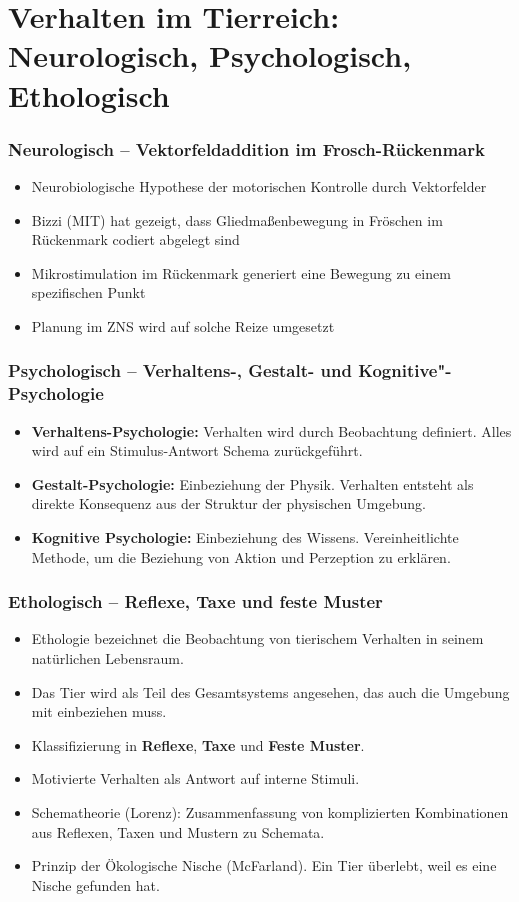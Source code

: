 \section{Verhalten im Tierreich: Neurologisch, Psychologisch, Ethologisch}

\subsubsection{Neurologisch -- Vektorfeldaddition im Frosch-Rückenmark}
\begin{itemize}
	\item Neurobiologische Hypothese der motorischen Kontrolle durch Vektorfelder
	\item Bizzi (MIT) hat gezeigt, dass Gliedmaßenbewegung in Fröschen im Rückenmark codiert abgelegt sind
	\item Mikrostimulation im Rückenmark generiert eine Bewegung zu einem spezifischen Punkt
	\item Planung im ZNS wird auf solche Reize umgesetzt
\end{itemize}

\subsubsection{Psychologisch -- Verhaltens-, Gestalt- und Kognitive"-Psychologie}
\begin{itemize}
	\item \textbf{Verhaltens-Psychologie:}
	Verhalten wird durch Beobachtung definiert.
	Alles wird auf ein Stimulus-Antwort Schema zurückgeführt.
	\item \textbf{Gestalt-Psychologie:}
	Einbeziehung der Physik.
	Verhalten entsteht als direkte Konsequenz aus der Struktur der physischen Umgebung.
	\item \textbf{Kognitive Psychologie:}
	Einbeziehung des Wissens.
	Vereinheitlichte Methode, um die Beziehung von Aktion und Perzeption zu erklären.
\end{itemize}

\subsubsection{Ethologisch -- Reflexe, Taxe und feste Muster}
\begin{itemize}
	\item Ethologie bezeichnet die Beobachtung von tierischem Verhalten in seinem natürlichen Lebensraum.
	\item Das Tier wird als Teil des Gesamtsystems angesehen, das auch die Umgebung mit einbeziehen muss.
	\item Klassifizierung in \textbf{Reflexe}, \textbf{Taxe} und \textbf{Feste  Muster}.
	\item Motivierte Verhalten als Antwort auf interne Stimuli.
	\item Schematheorie (Lorenz): Zusammenfassung von komplizierten Kombinationen aus Reflexen, Taxen und Mustern zu Schemata.
	\item Prinzip der \glqq Ökologische Nische \grqq (McFarland). Ein Tier überlebt, weil es eine Nische gefunden hat.
\end{itemize}

